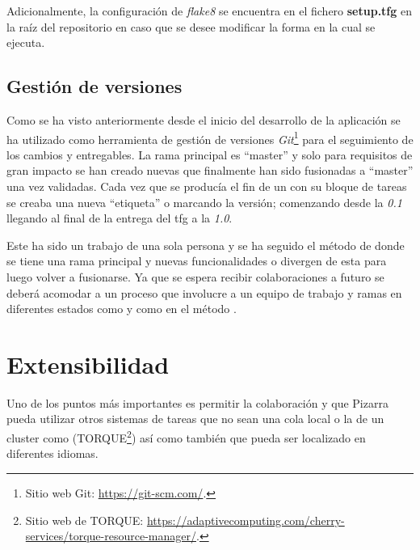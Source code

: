 \documentclass[11pt,spanish,listoffigures,listoftables]{tfgetsinf}
\begin{document}
Adicionalmente, la configuración de \textit{flake8} se encuentra en el fichero \textbf{setup.tfg} en la raíz del repositorio en caso que se desee modificar la forma en la cual se ejecuta.

\begin{code}{setup.tfg}}
[flake8]
max-line-length=100
ignore=E402,E266
exclude=./migrations
\end{code}

\section{Gestión de versiones}

Como se ha visto anteriormente desde el inicio del desarrollo de la aplicación se ha utilizado como herramienta de gestión de versiones \textit{Git}\footnote{Sitio web Git: \url{https://git-scm.com/}.} para el seguimiento de los cambios y entregables. La rama principal es ``master'' y solo para requisitos de gran impacto se han creado nuevas que finalmente han sido fusionadas a ``master'' una vez validadas. Cada vez que se producía el fin de un  con su bloque de tareas se creaba una nueva ``etiqueta'' o  marcando la versión; comenzando desde la \textit{0.1} llegando al final de la entrega del \acrshort{tfg} a la \textit{1.0}.

Este ha sido un trabajo de una sola persona y se ha seguido el método de  \cite{link-git-flow} donde se tiene una rama principal y nuevas funcionalidades o  divergen de esta para luego volver a fusionarse. Ya que se espera recibir colaboraciones a futuro se deberá acomodar a un proceso que involucre a un equipo de trabajo y ramas en diferentes estados como  y  como en el método .

\chapter{Extensibilidad}

Uno de los puntos más importantes es permitir la colaboración y que Pizarra pueda utilizar otros sistemas de tareas que no sean una \Gls{cola} local o la de un cluster como \kahan(TORQUE\footnote{Sitio web de TORQUE: \url{https://adaptivecomputing.com/cherry-services/torque-resource-manager/}.}) así como también que pueda ser localizado en diferentes idiomas.
\end{document}
